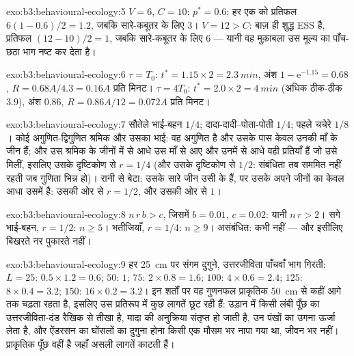 \begin{solution}{exo:b3:behavioural-ecology:5}
$V = 6$, $C = 10$: $p^{*} = 0.6$; हर एक को प्रतिफल $6(1 - 0.6)/2 = 1.2$,
जबकि सारे-कबूतर के लिए $3$। $V = 12 > C$: बाज़ ही शुद्ध ESS है, प्रतिफल
$(12 - 10)/2 = 1$, जबकि सारे-कबूतर के लिए $6$ --- यानी वह मुक़ाबला उस
मूल्य का पाँच-छठा भाग नष्ट कर देता है।
\end{solution}

\begin{solution}{exo:b3:behavioural-ecology:6}
$\tau = T_{0}$: $t^{*} = 1.15\times 2 = \qty{2.3}{min}$, अंश $1 -
\mathrm{e}^{-1.15} = 0.68$, $R = 0.68A/4.3 = 0.16A$ प्रति मिनट। $\tau =
4T_{0}$: $t^{*} = 2.0\times 2 = \qty{4}{min}$ (अधिक ठीक-ठीक $3.9$),
अंश $0.86$, $R = 0.86A/12 = 0.072A$ प्रति मिनट।
\end{solution}

\begin{solution}{exo:b3:behavioural-ecology:7}
सौतेले भाई-बहन $1/4$; दादा-दादी--पोता-पोती $1/4$; पहले चचेरे $1/8$।
कोई अगुणित-द्विगुणित श्रमिक और उसका भाई: वह अगुणित है और उसके पास केवल
उनकी माँ के जीन हैं; और उस श्रमिक के जीनों में से आधे उस माँ से आए और
उनमें से आधे वही प्रतियाँ हैं जो उसे मिलीं, इसलिए उसके दृष्टिकोण से
$r = 1/4$ (और उसके दृष्टिकोण से $1/2$: संबंधिता तब सममित नहीं रहती जब
गुणिता भिन्न हो)। रानी से बेटा: उसके सारे जीन उसी के हैं, पर उसके अपने
जीनों का केवल आधा उसमें है: उसकी ओर से $r = 1/2$, और उसकी ओर से $1$।
\end{solution}

\begin{solution}{exo:b3:behavioural-ecology:8}
$n\,r\,b > c$, जिसमें $b = 0.01$, $c = 0.02$: यानी $n\,r > 2$। सगे
भाई-बहन, $r
= 1/2$: $n \ge 5$। भतीजियाँ, $r = 1/4$: $n \ge 9$।
असंबंधित: कभी नहीं --- और इसीलिए बिखरते नर पुकारते नहीं।
\end{solution}

\begin{solution}{exo:b3:behavioural-ecology:9}
हर \qty{25}{cm} पर संगम दुगुने, उत्तरजीविता पाँचवाँ भाग गिरती: $L = 25$:
$0.5\times 1.2 = 0.6$; $50$: $1$; $75$: $2\times 0.8 = 1.6$; $100$:
$4\times 0.6 = 2.4$; $125$: $8\times 0.4 = 3.2$; $150$: $16\times 0.2 =
3.2$। इन शर्तों पर वह गुणनफल प्राकृतिक \qty{50}{cm} से कहीं आगे तक चढ़ता
रहता है, इसलिए उस प्रतिरूप में कुछ लागतें छूट रही हैं: उड़ान में किसी
लंबी पूँछ का उत्तरजीविता-दंड रैखिक से तीखा है, मादा की अनुक्रिया संतृप्त
हो जाती है, उन पंखों का उगना ऊर्जा लेता है, और ऐंडरसन का घोंसलों का
दुगुना होना किसी एक मौसम भर नापा गया था, जीवन भर नहीं। प्राकृतिक पूँछ
वहीं है जहाँ असली लागतें काटती हैं।
\end{solution}

